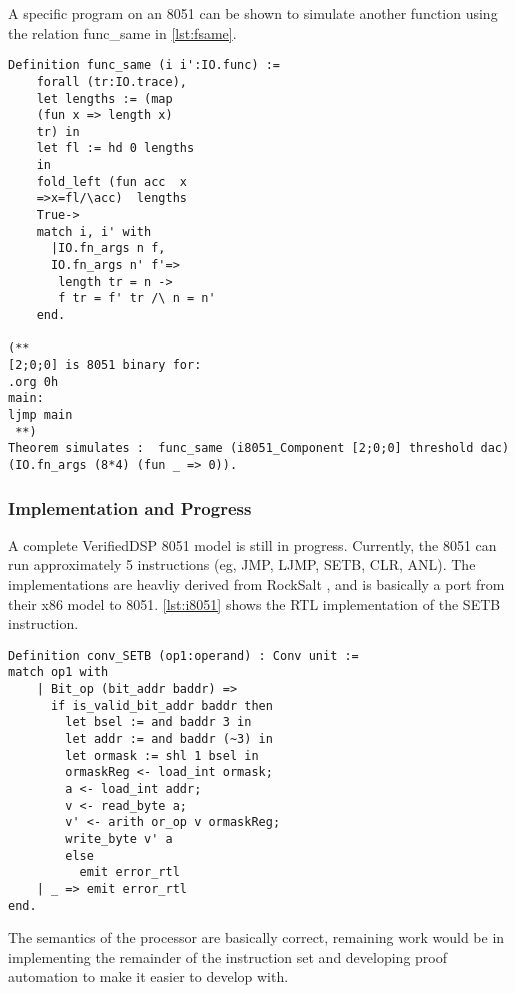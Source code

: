 \documentclass[preprint,12pt]{sigplanconf}
\begin{document}
A specific program on an 8051 can be shown to simulate another
function using the relation func\_same in \autoref{lst:fsame}. 

\begin{lstlisting}[language=Coq, label={lst:fsame}, caption={Check
that over any well formed IO.trace, two IO.funcs have identical
results. In Theorem simulates, an 8051 is shown to simulate a zero function} ]
Definition func_same (i i':IO.func) := 
    forall (tr:IO.trace),
    let lengths := (map
    (fun x => length x)
    tr) in 
    let fl := hd 0 lengths
    in
    fold_left (fun acc  x
    =>x=fl/\acc)  lengths
    True->
    match i, i' with
      |IO.fn_args n f,
      IO.fn_args n' f'=>
       length tr = n ->
       f tr = f' tr /\ n = n'
    end.

(** 
[2;0;0] is 8051 binary for:
.org 0h
main:
ljmp main
 **)
Theorem simulates :  func_same (i8051_Component [2;0;0] threshold dac)
(IO.fn_args (8*4) (fun _ => 0)).
\end{lstlisting}


\subsubsection{Implementation and Progress}
A complete VerifiedDSP 8051 model is still in progress. Currently, the
8051 can run approximately 5 instructions (eg, JMP, LJMP, SETB, CLR,
ANL). The implementations are heavliy derived from RockSalt
\cite{rocksalt}, and is basically a port from their x86 model to
8051. \autoref{lst:i8051} shows the RTL implementation of the SETB instruction.


\begin{lstlisting}[language=Coq, label={lst:i8051}, caption={The SETB
instructions Register Transfer Logic implementation. The argument type is first
checked, and then the argument is checked to be a valid bit address
(not all values are bit addressable). The proper bit is or'ed into memory.}]
Definition conv_SETB (op1:operand) : Conv unit :=
match op1 with
    | Bit_op (bit_addr baddr) =>
      if is_valid_bit_addr baddr then
        let bsel := and baddr 3 in
        let addr := and baddr (~3) in
        let ormask := shl 1 bsel in
        ormaskReg <- load_int ormask;
        a <- load_int addr;
        v <- read_byte a;
        v' <- arith or_op v ormaskReg;
        write_byte v' a
        else
          emit error_rtl
    | _ => emit error_rtl
end.
\end{lstlisting}

The semantics of the processor are basically correct, remaining work
would be in implementing the remainder of the instruction set and
developing proof automation to make it easier to develop with.
\end{document}
